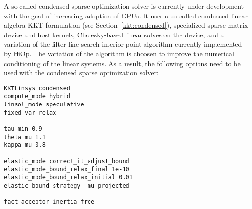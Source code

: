 A so-called condensed sparse optimization solver is currently under development with the goal of increasing adoption of GPUs. It uses a so-called condensed linear algebra KKT formulation (see Section~\ref{kkt:condensed}), specialized sparse matrix device and host kernels, Cholesky-based linear solves on the device, and a variation of the filter line-search interior-point algorithm currently implemented by HiOp. The variation of the algorithm is choosen to improve the numerical conditioning of the linear systems. As a result, the following options need to be used with the condensed sparse optimization solver:
\begin{lstlisting}
KKTLinsys condensed
compute_mode hybrid
linsol_mode speculative 
fixed_var relax

tau_min 0.9
theta_mu 1.1
kappa_mu 0.8

elastic_mode correct_it_adjust_bound 
elastic_mode_bound_relax_final 1e-10
elastic_mode_bound_relax_initial 0.01
elastic_bound_strategy  mu_projected 

fact_acceptor inertia_free 
\end{lstlisting} 